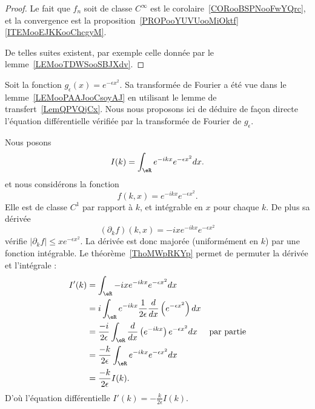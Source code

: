 \begin{proof}
	Le fait que \( f_n\) soit de classe \(  C^{\infty}\) est le corolaire~\ref{CORooBSPNooFwYQrc}, et la convergence est la proposition~\ref{PROPooYUVUooMiOktf}\ref{ITEMooEJKKooChcgyM}.

	De telles suites existent, par exemple celle donnée par le lemme~\ref{LEMooTDWSooSBJXdv}.
\end{proof}

\begin{example} \label{EXooLMXKooFcAZGR}
	Soit la fonction \( g_{\epsilon}(x)= e^{-\epsilon x^2}\). Sa transformée de Fourier a été vue dans le lemme~\ref{LEMooPAAJooCsoyAJ} en utilisant le lemme de transfert~\ref{LemQPVQjCx}. Nous nous proposons ici de déduire de façon directe l'équation différentielle vérifiée par la transformée de Fourier de \( g_{\epsilon}\).

	Nous posons
	\begin{equation}
		I(k)=\int_{\eR} e^{-ikx} e^{-\epsilon x^2}dx.
	\end{equation}
	et nous considérons la fonction
	\begin{equation}
		f(k,x)= e^{-ikx} e^{-\epsilon x^2}.
	\end{equation}
	Elle est de classe \( C^1\) par rapport à \( k\), et intégrable en \( x\) pour chaque \( k\). De plus sa dérivée
	\begin{equation}
		(\partial_k f)(k,x)=-ix e^{-ikx} e^{-\epsilon x^2}
	\end{equation}
	vérifie \( | \partial_kf |\leq x e^{-\epsilon x^2}\). La dérivée est donc majorée (uniformément en \( k\)) par une fonction intégrable. Le théorème~\ref{ThoMWpRKYp} permet de permuter la dérivée et l'intégrale :
	\begin{subequations}
		\begin{align}
			I'(k) & =\int_{\eR}-ix e^{-ikx} e^{-\epsilon x^2}dx                                                                         \\
			      & =i\int_{\eR} e^{-ikx}\frac{1}{ 2\epsilon } \frac{ d  }{ dx }\left(  e^{-\epsilon x^2} \right)dx                     \\
			      & =\frac{ -i }{ 2\epsilon }\int_{\eR}\frac{ d }{ dx }\left(  e^{-ikx} \right) e^{-\epsilon x^2}dx & \text{par partie} \\
			      & =\frac{ -k }{ 2\epsilon }\int_{\eR} e^{-ikx} e^{-\epsilon x^2}dx                                                    \\
			      & =\frac{ -k }{ 2\epsilon }I(k).
		\end{align}
	\end{subequations}
	D'où l'équation différentielle \( I'(k)=-\frac{ k }{ 2\epsilon }I(k)\).
\end{example}

